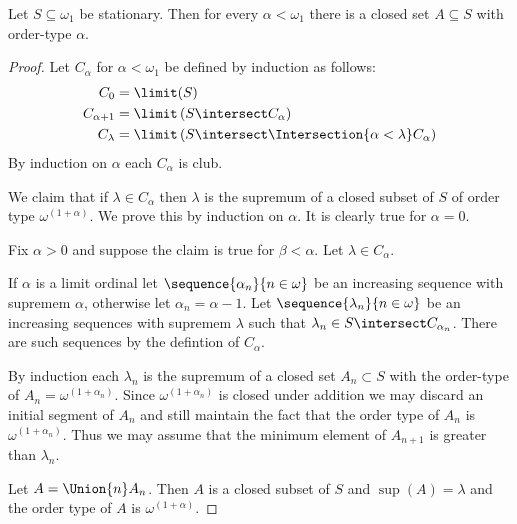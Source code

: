 \documentclass[oneside,12pt]{amsart}
\begin{document}
\begin{lemma}
Let $S\subseteq \omega_1$ be stationary. Then for every $\alpha <\omega_1$ there is a closed
set $A\subseteq S$ with order-type $\alpha$.
\end{lemma}
\begin{proof}
Let $C_{\alpha}$ for $\alpha<\omega_1$ be defined by induction as follows:
\begin{align*}
C_0 &=  \limit(S) \\
C_{\alpha+1} &=  \limit \left ( S \intersect C_\alpha\right ) \\
C_{\lambda} &=  \limit \left ( S \intersect \Intersection{\alpha<\lambda} C_\alpha \right )
\end{align*}
By induction on $\alpha$ each $C_{\alpha}$ is club.

We claim that if $\lambda \in C_{\alpha}$ then $\lambda$ is the supremum of a closed subset
of $S$ of order type $\omega^{(1 + \alpha)}$. We prove this by induction on $\alpha$.
It is clearly true for $\alpha = 0$.

Fix $\alpha>0$
and suppose the claim is true for $\beta<\alpha$. Let $\lambda \in C_{\alpha}$.


If $\alpha$ is a limit ordinal let $\sequence{\alpha_n}{n\in\omega}$
be an increasing sequence with supremem $\alpha$, otherwise let $\alpha_n = \alpha-1$.
Let
$\sequence{\lambda_n}{n\in\omega}$ be an increasing sequences with supremem $\lambda$
such that $\lambda_n \in S\intersect C_{\alpha_n}$. There are such sequences by the defintion of
$C_{\alpha}$.

By induction each $\lambda_n$ is the supremum of a closed set $A_n \subset S$ with the order-type
of $A_n  = \omega^{(1 + \alpha_n)}$. Since  $\omega^{(1 + \alpha_n)}$ is closed under addition
we may discard an initial segment of $A_n$ and still maintain the fact that the order type of
$A_n$ is $\omega^{(1 + \alpha_n)}$. Thus we may assume that the minimum element of $A_{n+1}$ is
greater than $\lambda_n$.

Let $A= \Union{n} A_n$.
Then $A$ is a closed subset of $S$ and $\sup(A) = \lambda$ and the order type of $A$ is
$\omega^{(1+\alpha)}$.
\end{proof}
\end{document}
